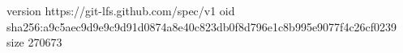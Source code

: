 version https://git-lfs.github.com/spec/v1
oid sha256:a9c5aec9d9e9c9d91d0874a8e40c823db0f8d796e1c8b995e9077f4c26cf0239
size 270673
